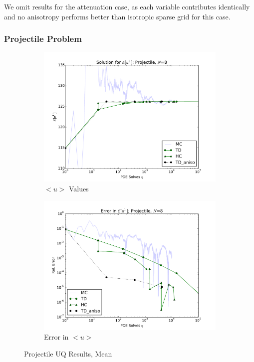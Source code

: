\documentclass[11pt]{article}
\begin{document}
We omit results for the attenuation case, as each variable contributes identically and no anisotropy performs better than isotropic sparse grid for this case.

\subsubsection{Projectile Problem}
\begin{figure}[H]
    \centering
    \begin{subfigure}[b]{0.49 \textwidth}
      \includegraphics[width=\textwidth]{../graphics/projectile_solns_aniso}
      \caption{$<u>$ Values}
      \label{atn vals hdmr}
  \end{subfigure}
\begin{subfigure}[b]{0.49 \textwidth}
\centering
      \includegraphics[width=\textwidth]{../graphics/projectile_errs_aniso}
      \caption{Error in $<u>$}
      \label{atn errs hdmr}
    \end{subfigure}
  \caption{Projectile UQ Results, Mean}
  \label{atn results}
  \end{figure}
\end{document}
